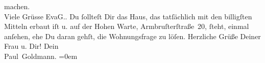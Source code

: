 \begin{ledgroupsized}[t]{13cm}
{                     machen. {\\}Viele Grüsse \spacefill\mbox{EvaG.}}. Du ſollteſt Dir das Haus, das tatſächlich mit den billigſten Mitteln erbaut iſt u. auf der Hohen Warte, Armbruſterſtraße 20, ſteht, einmal anſehen, ehe Du daran gehſt, die
               Wohnungsfrage zu löſen.\pend
           \pstart
           Herzliche Grüße Deiner Frau u. Dir! Dein {\\[\baselineskip]}\spacefill\mbox{Paul Goldmann.}\pend
           \leftskip=0em{}
         
         \endnumbering{}\end{ledgroupsized}\begin{anhang}\end{anhang}\newcommand{\dateiname}{L03469}\newcommand{\titel}{Paul Goldmann und Eva Marie Goldmann an Arthur Schnitzler, 1. 10. 1909}\newcommand{\editorInnen}{Martin Anton Müller und Laura Untner}
      